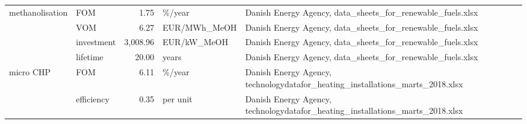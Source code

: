\begin{longtable}{p{5cm}p{3cm}rp{3cm}p{11cm}}
methanolisation & FOM &           1.75 &                            \%/year &                                                                                                                                                                                                                                                                           Danish Energy Agency, data\_sheets\_for\_renewable\_fuels.xlsx \\
                      & VOM &           6.27 &                      EUR/MWh\_MeOH &                                                                                                                                                                                                                                                                           Danish Energy Agency, data\_sheets\_for\_renewable\_fuels.xlsx \\
                      & investment &       3,008.96 &                       EUR/kW\_MeOH &                                                                                                                                                                                                                                                                           Danish Energy Agency, data\_sheets\_for\_renewable\_fuels.xlsx \\
                      & lifetime &          20.00 &                             years &                                                                                                                                                                                                                                                                           Danish Energy Agency, data\_sheets\_for\_renewable\_fuels.xlsx \\
micro CHP & FOM &           6.11 &                            \%/year &                                                                                                                                                                                                                                                        Danish Energy Agency, technologydatafor\_heating\_installations\_marts\_2018.xlsx \\
                      & efficiency &           0.35 &                          per unit &                                                                                                                                                                                                                                                        Danish Energy Agency, technologydatafor\_heating\_installations\_marts\_2018.xlsx \\

\end{longtable}
